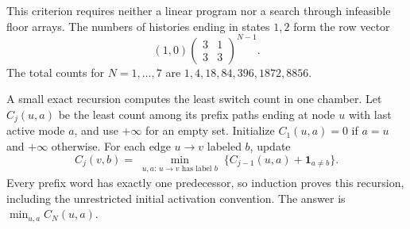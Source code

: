 This criterion requires neither a linear program nor a search through
infeasible floor arrays. The numbers of histories ending in states $1,2$
form the row vector
\begin{equation}\label{eq:floor-count}
 (1,0)\begin{pmatrix}3&1\\3&3\end{pmatrix}^{N-1}.
\end{equation}
The total counts for $N=1,\ldots,7$ are
$1,4,18,84,396,1872,8856$.

A small exact recursion computes the least switch count in one chamber.
Let $C_j(u,a)$ be the least count among its prefix paths ending
at node $u$ with last active mode $a$, and use $+\infty$ for an empty set.
Initialize $C_1(u,a)=0$ if $a=u$ and $+\infty$ otherwise. For each edge
$u\to v$ labeled $b$, update
\begin{equation}\label{eq:floor-cost-DP}
 C_j(v,b)=\min_{\substack{u,a:\,u\to v\text{ has label }b}}
       \{C_{j-1}(u,a)+\mathbf1_{a\ne b}\}.
\end{equation}
Every prefix word has exactly one predecessor, so induction proves this
recursion, including the unrestricted initial activation convention.
The answer is $\min_{u,a}C_N(u,a)$.


